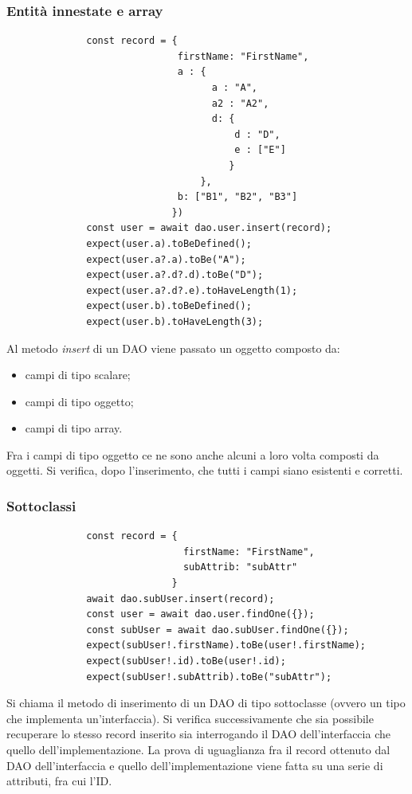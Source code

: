 \documentclass[a4paper, 12pt]{report}
\begin{document}
          \subsubsection{Entità innestate e array}
            \begin{Verbatim}
              const record = {
                              firstName: "FirstName",
                              a : { 
                                    a : "A",
                                    a2 : "A2",
                                    d: { 
                                        d : "D",
                                        e : ["E"]
                                       }
                                  },
                              b: ["B1", "B2", "B3"]
                             })
              const user = await dao.user.insert(record);
              expect(user.a).toBeDefined();
              expect(user.a?.a).toBe("A");
              expect(user.a?.d?.d).toBe("D");
              expect(user.a?.d?.e).toHaveLength(1);
              expect(user.b).toBeDefined();
              expect(user.b).toHaveLength(3);
            \end{Verbatim}
            Al metodo \emph{insert} di un DAO viene passato un oggetto composto da:
            \begin{itemize}
              \item campi di tipo scalare;
              \item campi di tipo oggetto;
              \item campi di tipo array.
            \end{itemize}
            Fra i campi di tipo oggetto ce ne sono anche alcuni a loro volta composti da oggetti.
            Si verifica, dopo l'inserimento, che tutti i campi siano esistenti e corretti.
          \subsubsection{Sottoclassi}
            \begin{Verbatim}
              const record = { 
                               firstName: "FirstName",
                               subAttrib: "subAttr"
                             }
              await dao.subUser.insert(record);
              const user = await dao.user.findOne({});
              const subUser = await dao.subUser.findOne({});
              expect(subUser!.firstName).toBe(user!.firstName);
              expect(subUser!.id).toBe(user!.id);
              expect(subUser!.subAttrib).toBe("subAttr");
            \end{Verbatim}
            Si chiama il metodo di inserimento di un DAO di tipo sottoclasse (ovvero un tipo che implementa un'interfaccia). Si verifica successivamente che sia possibile recuperare lo stesso record inserito sia interrogando il DAO dell'interfaccia che quello dell'implementazione. La prova di uguaglianza fra il record ottenuto dal DAO
            dell'interfaccia e quello dell'implementazione viene fatta su una serie di attributi, fra cui l'ID.
\end{document}
